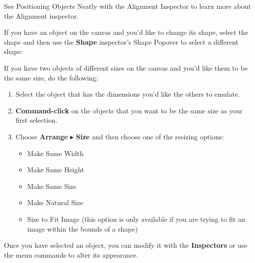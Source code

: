 \documentclass[../main.tex]{subfiles}
\begin{document}

\begin{ognote}
  See Positioning Objects Neatly with the Alignment Inspector to learn more about the Alignment
  inspector.
\end{ognote}

If you have an object on the canvas and you'd like to change its shape, select the shape and
then use the \textbf{Shape} inspector's Shape Popover to select a different shape:


If you have two objects of different sizes on the canvas and you'd like them to be the same
size, do the following:

\begin{enumerate}
  \item Select the object that has the dimensions you'd like the others to emulate.
  \item \textbf{Command-click} on the objects that you want to be the same size as your first
    selection.
  \item Choose \textbf{Arrange} $\blacktriangleright$ \textbf{Size} and then choose one of the
    resizing options:

    \begin{itemize}
      \item Make Same Width
      \item Make Same Height
      \item Make Same Size
      \item Make Natural Size
      \item Size to Fit Image (this option is only available if you are trying to fit an image
        within the bounds of a shape)
    \end{itemize}
\end{enumerate}


Once you have selected an object, you can modify it with the \textbf{Inspectors} or use the menu
commands to alter its appearance.
\end{document}
